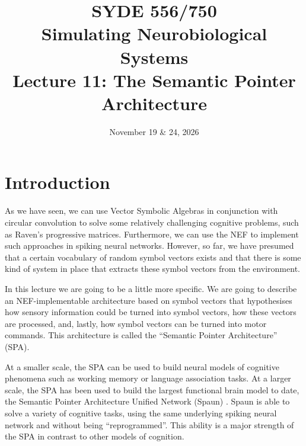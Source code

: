 \documentclass[10pt,letterpaper,oneside]{article}
\date{November 19 \& 24, 2026}
\title{SYDE 556/750 \\ Simulating Neurobiological Systems \\ Lecture 11: The Semantic Pointer Architecture}
\begin{document}

\section{Introduction}


As we have seen, we can use Vector Symbolic Algebras in conjunction with circular convolution to solve some relatively challenging cognitive problems, such as Raven's progressive matrices. Furthermore, we can use the NEF to implement such approaches in spiking neural networks. However, so far, we have presumed that a certain vocabulary of random symbol vectors exists and that there is some kind of system in place that extracts these symbol vectors from the environment.

In this lecture we are going to be a little more specific. We are going to describe an NEF-implementable architecture based on symbol vectors that hypothesises how sensory information could be turned into symbol vectors, how these vectors are processed, and, lastly, how symbol vectors can be turned into motor commands. This architecture is called the \enquote{Semantic Pointer Architecture} (SPA).

At a smaller scale, the SPA can be used to build neural models of cognitive phenomena such as working memory or language association tasks. At a larger scale, the SPA has been used to build the largest functional brain model to date, the Semantic Pointer Architecture Unified Network (Spaun) \cite{eliasmith2012largescale,choo2018spaun}. Spaun is able to solve a variety of cognitive tasks, using the same underlying spiking neural network and without being \enquote{reprogrammed}. This ability is a major strength of the SPA in contrast to other models of cognition.
\end{document}
